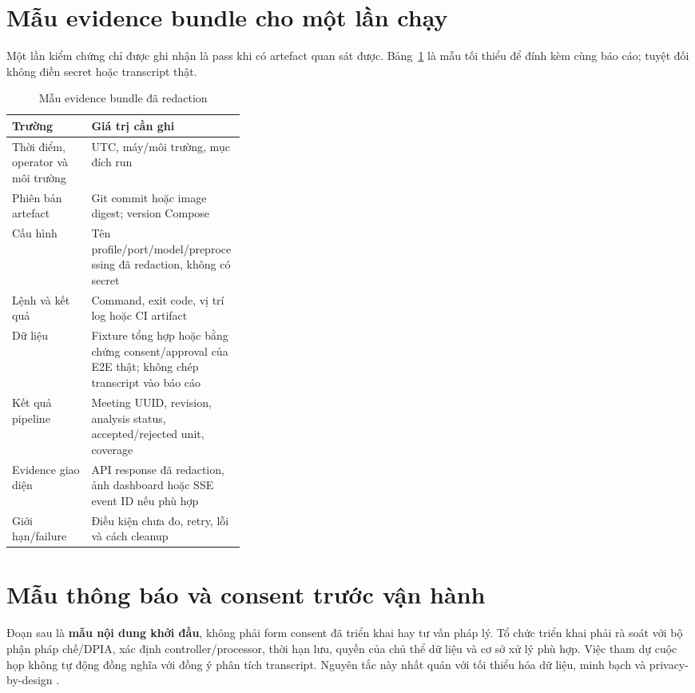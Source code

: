 \section{Mẫu evidence bundle cho một lần chạy}
Một lần kiểm chứng chỉ được ghi nhận là pass khi có artefact quan sát được. Bảng~\ref{tab:appendix-evidence} là mẫu tối thiểu để đính kèm cùng báo cáo; tuyệt đối không điền secret hoặc transcript thật.

\begin{table}[H]
\centering
\caption{Mẫu evidence bundle đã redaction}
\label{tab:appendix-evidence}
\begin{tabularx}{\linewidth}{p{0.34\linewidth}X}
\toprule
\textbf{Trường} & \textbf{Giá trị cần ghi} \\
\midrule
Thời điểm, operator và môi trường & UTC, máy/môi trường, mục đích run \\
Phiên bản artefact & Git commit hoặc image digest; version Compose \\
Cấu hình & Tên profile/port/model/preprocessing đã redaction, không có secret \\
Lệnh và kết quả & Command, exit code, vị trí log hoặc CI artifact \\
Dữ liệu & Fixture tổng hợp hoặc bằng chứng consent/approval của E2E thật; không chép transcript vào báo cáo \\
Kết quả pipeline & Meeting UUID, revision, analysis status, accepted/rejected unit, coverage \\
Evidence giao diện & API response đã redaction, ảnh dashboard hoặc SSE event ID nếu phù hợp \\
Giới hạn/failure & Điều kiện chưa đo, retry, lỗi và cách cleanup \\
\bottomrule
\end{tabularx}
\end{table}

\section{Mẫu thông báo và consent trước vận hành}
Đoạn sau là \textbf{mẫu nội dung khởi đầu}, không phải form consent đã triển khai hay tư vấn pháp lý. Tổ chức triển khai phải rà soát với bộ phận pháp chế/DPIA, xác định controller/processor, thời hạn lưu, quyền của chủ thể dữ liệu và cơ sở xử lý phù hợp. Việc tham dự cuộc họp không tự động đồng nghĩa với đồng ý phân tích transcript. Nguyên tắc này nhất quán với tối thiểu hóa dữ liệu, minh bạch và privacy-by-design \cite{decree132023,cavoukian2011}.

